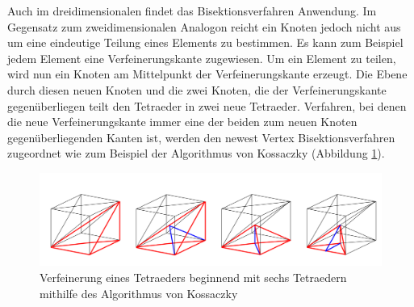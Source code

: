Auch im dreidimensionalen findet das Bisektionsverfahren Anwendung. Im Gegensatz zum zweidimensionalen Analogon reicht ein Knoten jedoch nicht aus um eine eindeutige Teilung eines Elements zu bestimmen. Es kann zum Beispiel jedem Element eine Verfeinerungskante zugewiesen. Um ein Element zu teilen, wird nun ein Knoten am Mittelpunkt der Verfeinerungskante erzeugt. Die Ebene durch diesen neuen Knoten und die zwei Knoten, die der Verfeinerungskante gegenüberliegen teilt den Tetraeder in zwei neue Tetraeder. Verfahren, bei denen die neue Verfeinerungskante immer eine der beiden zum neuen Knoten gegenüberliegenden Kanten ist, werden den newest Vertex Bisektionsverfahren zugeordnet wie zum Beispiel der Algorithmus von Kossaczky (Abbildung \ref{kos}).

\begin{figure}[!htbp]
\begin{center}
	\includegraphics[width=16cm]{pics/bisec3.png}
\end{center}
\caption{\label{kos}Verfeinerung eines Tetraeders beginnend mit sechs Tetraedern mithilfe des Algorithmus von Kossaczky}
\end{figure}